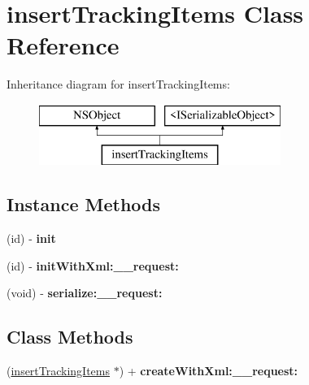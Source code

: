 \hypertarget{interfaceinsert_tracking_items}{}\section{insert\+Tracking\+Items Class Reference}
\label{interfaceinsert_tracking_items}
Inheritance diagram for insert\+Tracking\+Items\+:\begin{figure}[H]
\begin{center}
\leavevmode
\includegraphics[height=2.000000cm]{interfaceinsert_tracking_items}
\end{center}
\end{figure}
\subsection*{Instance Methods}
\begin{DoxyCompactItemize}
\item 
\hypertarget{interfaceinsert_tracking_items_a1d0ae4e41a481619d60c5559c4efd35c}{}(id) -\/ {\bfseries init}\label{interfaceinsert_tracking_items_a1d0ae4e41a481619d60c5559c4efd35c}

\item 
\hypertarget{interfaceinsert_tracking_items_aaf55790ea854fb683a70def00b286d05}{}(id) -\/ {\bfseries init\+With\+Xml\+:\+\_\+\+\_\+request\+:}\label{interfaceinsert_tracking_items_aaf55790ea854fb683a70def00b286d05}

\item 
\hypertarget{interfaceinsert_tracking_items_a11a28df79332f19d9df56db89b37c9c5}{}(void) -\/ {\bfseries serialize\+:\+\_\+\+\_\+request\+:}\label{interfaceinsert_tracking_items_a11a28df79332f19d9df56db89b37c9c5}

\end{DoxyCompactItemize}
\subsection*{Class Methods}
\begin{DoxyCompactItemize}
\item 
\hypertarget{interfaceinsert_tracking_items_ad219b31fb8e24278f70e0bd389afa5f7}{}(\hyperlink{interfaceinsert_tracking_items}{insert\+Tracking\+Items} $\ast$) + {\bfseries create\+With\+Xml\+:\+\_\+\+\_\+request\+:}\label{interfaceinsert_tracking_items_ad219b31fb8e24278f70e0bd389afa5f7}

\end{DoxyCompactItemize}
